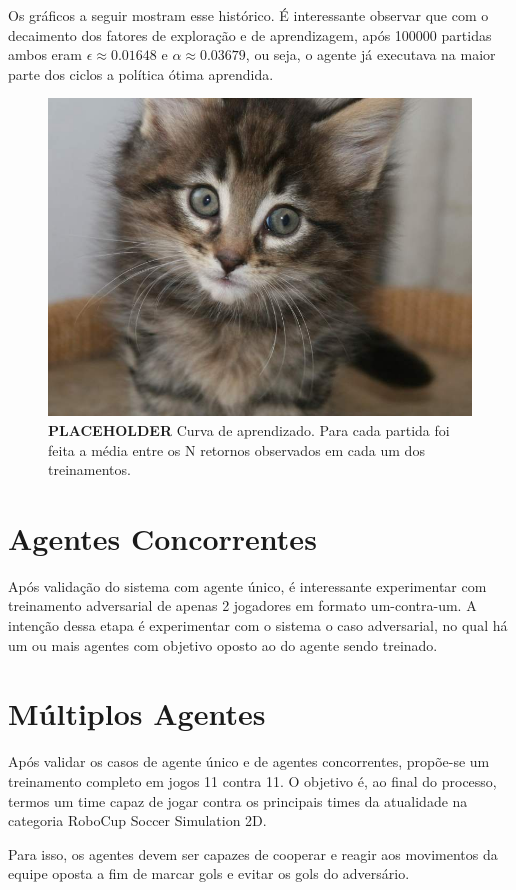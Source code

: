 Os gráficos a seguir mostram esse histórico. É interessante observar que com o decaimento dos fatores de exploração e de aprendizagem, após 100000 partidas ambos eram $\epsilon \approx 0.01648$ e $\alpha \approx 0.03679$, ou seja, o agente já executava na maior parte dos ciclos a política ótima aprendida.

\begin{figure}[h]
	\includegraphics[width=1.0\linewidth]{figs/placekitty4-3.jpg}
	\centering
	\caption{\textbf{PLACEHOLDER} Curva de aprendizado. Para cada partida foi feita a média entre os N retornos observados em cada um dos treinamentos.}
	\label{fig:single-agent-curva}
\end{figure}

\section{Agentes Concorrentes}

Após validação do sistema com agente único, é interessante experimentar com treinamento adversarial de apenas 2 jogadores em formato um-contra-um. A intenção dessa etapa é experimentar com o sistema o caso adversarial, no qual há um ou mais agentes com objetivo oposto ao do agente sendo treinado.

\section{Múltiplos Agentes}

Após validar os casos de agente único e de agentes concorrentes, propõe-se um treinamento completo em jogos 11 contra 11. O objetivo é, ao final do processo, termos um time capaz de jogar contra os principais times da atualidade na categoria RoboCup Soccer Simulation 2D.

Para isso, os agentes devem ser capazes de cooperar e reagir aos movimentos da equipe oposta a fim de marcar gols e evitar os gols do adversário.
